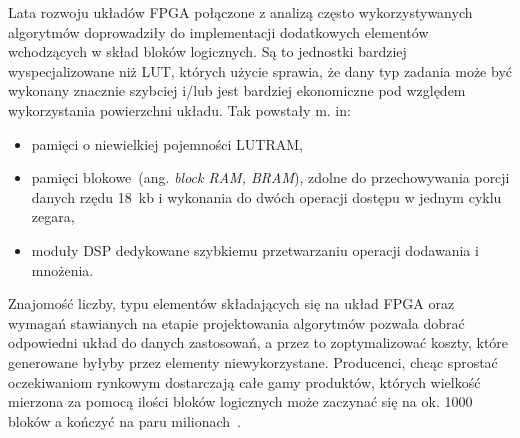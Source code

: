 
Lata rozwoju układów FPGA połączone z analizą często wykorzystywanych algorytmów doprowadziły do implementacji dodatkowych elementów wchodzących w skład bloków logicznych. Są to jednostki bardziej wyspecjalizowane niż LUT, których użycie sprawia, że dany typ zadania może być wykonany znacznie szybciej i/lub jest bardziej ekonomiczne pod względem wykorzystania powierzchni układu. Tak powstały m. in:
\begin{itemize}
\item pamięci o niewielkiej pojemności LUTRAM,
\item pamięci blokowe~(ang. \textit{block RAM, BRAM}), zdolne do przechowywania porcji danych rzędu 18~kb i wykonania do dwóch operacji dostępu w jednym cyklu zegara,
\item moduły DSP dedykowane szybkiemu przetwarzaniu operacji dodawania i mnożenia.
\end{itemize}
Znajomość liczby, typu elementów składających się na układ FPGA oraz wymagań stawianych na etapie projektowania algorytmów pozwala dobrać odpowiedni układ do danych zastosowań, a przez to zoptymalizować koszty, które generowane byłyby przez elementy niewykorzystane. Producenci, chcąc sprostać oczekiwaniom rynkowym dostarczają całe gamy produktów, których wielkość mierzona za pomocą ilości bloków logicznych może zaczynać się na ok. 1000 bloków a kończyć na paru milionach~\cite{XILINX_PRODUCT_TABLE}.


